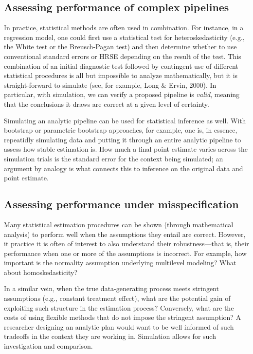 \documentclass[
]{book}
\begin{document}
\hypertarget{assessing-performance-of-complex-pipelines}{%
\subsection{Assessing performance of complex pipelines}\label{assessing-performance-of-complex-pipelines}}

In practice, statistical methods are often used in combination.
For instance, in a regression model, one could first use a statistical test for heteroskedasticity (e.g., the White test or the Breusch-Pagan test) and then determine whether to use conventional standard errors or HRSE depending on the result of the test. This combination of an initial diagnostic test followed by contingent use of different statistical procedures is all but impossible to analyze mathematically, but it is straight-forward to simulate (see, for example, Long \& Ervin, 2000).
In particular, with simulation, we can verify a proposed pipeline is \emph{valid}, meaning that the conclusions it draws are correct at a given level of certainty.

Simulating an analytic pipeline can be used for statistical inference as well.
With bootstrap or parametric bootstrap approaches, for example, one is, in essence, repeatidly simulating data and putting it through an entire analytic pipeline to assess how stable estimation is.
How much a final point estimate varies across the simulation trials is the standard error for the context being simulated; an argument by analogy is what connects this to inference on the original data and point estimate.

\hypertarget{assessing-performance-under-misspecification}{%
\subsection{Assessing performance under misspecification}\label{assessing-performance-under-misspecification}}

Many statistical estimation procedures can be shown (through mathematical analysis) to perform well when the assumptions they entail are correct.
However, it practice it is often of interest to also understand their robustness---that is, their performance when one or more of the assumptions is incorrect.
For example, how important is the normality assumption underlying multilevel modeling?
What about homoskedasticity?

In a similar vein, when the true data-generating process meets stringent assumptions (e.g., constant treatment effect), what are the potential gain of exploiting such structure in the estimation process?
Conversely, what are the costs of using flexible methods that do not impose the stringent assumption?
A researcher designing an analytic plan would want to be well informed of such tradeoffs in the context they are working in.
Simulation allows for such investigation and comparison.
\end{document}

